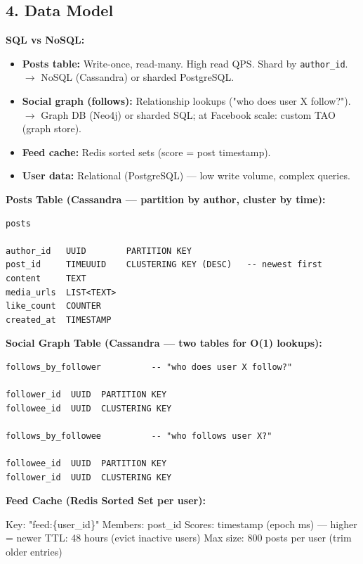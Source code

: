\documentclass[11pt]{article}
\providecommand{\tightlist}{\setlength{\itemsep}{1pt}\setlength{\parskip}{0pt}}
\newenvironment{Shaded}{\begin{snugshade}}{\end{snugshade}}
\newcommand{\DecValTok}[1]{\textcolor[rgb]{0.96,0.45,0.00}{#1}}
\newcommand{\NormalTok}[1]{\textcolor[rgb]{0.81,0.81,0.76}{#1}}
\newcommand{\OperatorTok}[1]{\textcolor[rgb]{0.81,0.81,0.76}{#1}}
\newcommand{\SpecialCharTok}[1]{\textcolor[rgb]{0.24,0.68,0.91}{#1}}
\newcommand{\StringTok}[1]{\textcolor[rgb]{0.96,0.31,0.31}{#1}}
\begin{document}
\subsection{4. Data Model}\label{4-data-model-2}

\textbf{SQL vs NoSQL:}

\begin{itemize}
\tightlist
\item
  \textbf{Posts table:} Write-once, read-many. High read QPS. Shard by \texttt{author\_id}. \(\rightarrow\) NoSQL (Cassandra) or sharded PostgreSQL.
\item
  \textbf{Social graph (follows):} Relationship lookups ("who does user X follow?"). \(\rightarrow\) Graph DB (Neo4j) or sharded SQL; at Facebook scale: custom TAO (graph store).
\item
  \textbf{Feed cache:} Redis sorted sets (score = post timestamp).
\item
  \textbf{User data:} Relational (PostgreSQL) --- low write volume, complex queries.
\end{itemize}

\textbf{Posts Table (Cassandra --- partition by author, cluster by time):}

\setcodelang{}

\begin{verbatim}
posts

author_id   UUID        PARTITION KEY
post_id     TIMEUUID    CLUSTERING KEY (DESC)   -- newest first
content     TEXT
media_urls  LIST<TEXT>
like_count  COUNTER
created_at  TIMESTAMP
\end{verbatim}

\textbf{Social Graph Table (Cassandra --- two tables for O(1) lookups):}

\setcodelang{}

\begin{verbatim}
follows_by_follower          -- "who does user X follow?"

follower_id  UUID  PARTITION KEY
followee_id  UUID  CLUSTERING KEY

follows_by_followee          -- "who follows user X?"

followee_id  UUID  PARTITION KEY
follower_id  UUID  CLUSTERING KEY
\end{verbatim}

\textbf{Feed Cache (Redis Sorted Set per user):}


\begin{Shaded}
\begin{Highlighting}[]
\NormalTok{Key:     }\StringTok{"feed:}\SpecialCharTok{\{user\_id\}}\StringTok{"}
\NormalTok{Members: post\_id}
\NormalTok{Scores:  timestamp (epoch ms) — higher }\OperatorTok{=}\NormalTok{ newer}
\NormalTok{TTL:     }\DecValTok{48}\NormalTok{ hours (evict inactive users)}
\NormalTok{Max size: }\DecValTok{800}\NormalTok{ posts per user (trim older entries)}
\end{Highlighting}
\end{Shaded}
\end{document}
